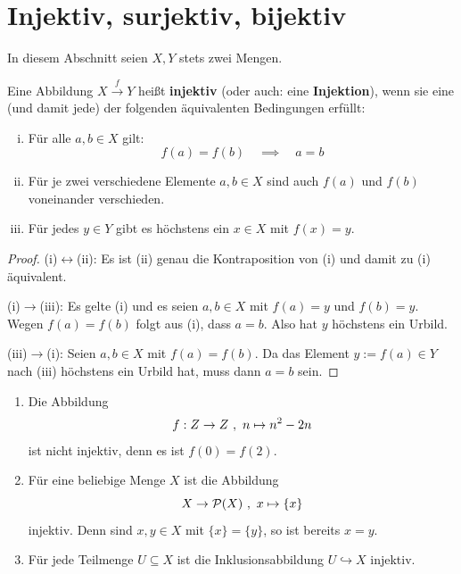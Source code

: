 \section{Injektiv, surjektiv, bijektiv}


In diesem Abschnitt seien $X,Y$ stets zwei Mengen.


\begin{defin} \label{def:injektiv} 
    Eine Abbildung $X \xrightarrow{f} Y$ heißt \textbf{injektiv} (oder auch: eine \textbf{Injektion}), wenn sie eine (und damit jede) der folgenden äquivalenten Bedingungen erfüllt:
    \begin{enumerate}[(i)]
        \item Für alle $a,b\in X$ gilt:
            \[ f(a)=f(b) \quad\implies\quad a=b \]
        \item Für je zwei verschiedene Elemente $a,b \in X$ sind auch $f(a)$ und $f(b)$ voneinander verschieden.
        \item Für jedes $y\in Y$ gibt es höchstens ein $x\in X$ mit $f(x)=y$.
    \end{enumerate}
\end{defin}
\begin{proof}
    (i)$\leftrightarrow$(ii): Es ist (ii) genau die Kontraposition von (i) und damit zu (i) äquivalent.

    (i)$\rightarrow$(iii): Es gelte (i) und es seien $a,b\in X$ mit $f(a)=y$ und $f(b)=y$. Wegen $f(a)=f(b)$ folgt aus (i), dass $a=b$. Also hat $y$ höchstens ein Urbild.

    (iii)$\rightarrow$(i): Seien $a,b\in X$ mit $f(a)=f(b)$. Da das Element $y:=f(a)\in Y$ nach (iii) höchstens ein Urbild hat, muss dann $a=b$ sein.
\end{proof}


\begin{bsp} \quad
    \begin{enumerate}
        \item Die Abbildung
            \[ f:\relax Z \to \relax Z \ ,\ n \mapsto n^2-2n \]
        ist nicht injektiv, denn es ist $f(0)=f(2)$.
        \item Für eine beliebige Menge $X$ ist die Abbildung
            \[ X \to \mathcal P(X) \ ,\ x \mapsto \{x\} \]
        injektiv. Denn sind $x,y\in X$ mit $\{x\}=\{y\}$, so ist bereits $x=y$.
        \item Für jede Teilmenge $U\subseteq X$ ist die Inklusionsabbildung $U\hookrightarrow X$ injektiv.
    \end{enumerate}
\end{bsp}
	


